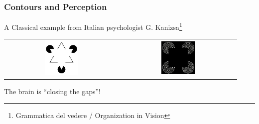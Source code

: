 \documentclass[10pt]{beamer}
\begin{document}
\begin{frame}
  \frametitle{Contours and Perception}
   A Classical example from Italian psychologist G. Kanizsa\footnote{Grammatica del vedere / Organization in Vision}
   \begin{center}
     \begin{tabular}[h]{cc}
        \includegraphics[width=0.3\textwidth]{IMAGES/kanizsa1} &
      \includegraphics[width=0.3\textwidth]{IMAGES/kanizsa2} \\
     \end{tabular}
   \end{center}
   The brain is ``closing the gaps''!
\end{frame}
\end{document}

